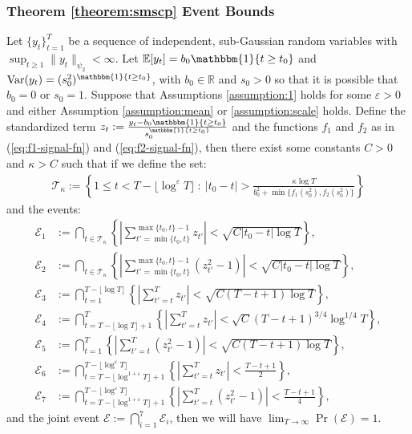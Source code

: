 
\subsubsection{Theorem \ref{theorem:smscp} Event Bounds}

\begin{lemma}\label{lemma:thm3-event-bound}
Let $\{y_t\}_{t=1}^T$ be a sequence of independent, sub-Gaussian random variables with $\sup_{t \geq 1} \lVert y_t\rVert_{\psi_2} < \infty$. Let $\E[y_t] = b_0\mathbbm{1}\{t\geq t_0\}$ and $\normalfont{\Var}(y_t) = (s_0^2)^{\mathbbm{1}\{t\geq t_0\}}$, with $b_0 \in \mathbb{R}$ and $s_0 > 0$ so that it is possible that $b_0 = 0$ or $s_0 = 1$. Suppose that Assumptions \ref{assumption:1} holds for some $\varepsilon >0$ and either Assumption \ref{assumption:mean} or \ref{assumption:scale} holds. Define the standardized term $z_t:= \frac{y_t - b_0\mathbbm{1}\{t\geq t_0\}}{s_0^{\mathbbm{1}\{t\geq t_0\}}}$ and the functions $f_1$ and $f_2$ as in (\ref{eq:f1-signal-fn}) and (\ref{eq:f2-signal-fn}), then there exist some constants $C > 0$ and $\kappa > C$ such that if we define the set:
\begin{align*}
    \mathcal{T}_{\kappa}:= \left\{1\leq t < T - \lfloor\log^{\varepsilon} T\rfloor\::\: |t_0 - t| > \frac{\kappa\log T}{b^2_0 + \min\{f_1(s_0^2),f_2(s_0^2)\}} \right\}
\end{align*}
and the events: 
\begin{align*}
    \mathcal{E}_1 &:= \bigcap_{t \in \mathcal{T}_{\kappa}} \left\{\left|\sum_{t'=\min\{t_0,t\}}^{\max\{t_0,t\}-1} z_{t'}\right| < \sqrt{C|t_0-t|\log T}\right\}, \\
    \mathcal{E}_2 &:=  \bigcap_{t \in \mathcal{T}_{\kappa}} \left\{\left|\sum_{t'=\min\{t_0,t\}}^{\max\{t_0,t\}-1} (z_{t'}^2 - 1) \right| <  \sqrt{C|t_0-t|\log T}  \right\},  \\
    \mathcal{E}_3 &:= \bigcap_{t = 1}^{ T - \lfloor\log T\rfloor}  \left\{\left|\sum_{t'=t}^T z_{t'}\right| < \sqrt{C(T-t+1)\log T}\right\}, \\
    \mathcal{E}_4 &:= \bigcap_{t = T - \lfloor \log T\rfloor +1}^T  \left\{\left|\sum_{t'=t}^T z_{t'}\right| < \sqrt{C}(T-t+1)^{3/4}\log^{1/4} T\right\}, \\
    \mathcal{E}_5 &:= \bigcap_{t=1}^T \left\{\left|\sum_{t'=t}^T (z_{t'}^2 - 1)\right| < \sqrt{C(T-t+1)\log T}\right\}, \\
    \mathcal{E}_6 &:= \bigcap_{t = T - \lfloor\log^{1+\varepsilon} T\rfloor + 1}^{T - \lfloor\log^{\varepsilon} T\rfloor} \left\{\left|\sum_{t'=t}^T z_{t'}\right| < \frac{T-t+1}{2}\right\}, \\
    \mathcal{E}_7 &:= \bigcap_{t = T - \lfloor\log^{1+\varepsilon} T\rfloor + 1}^{T - \lfloor\log^{\varepsilon} T\rfloor}  \left\{\left|\sum_{t'=t}^T (z_{t'}^2 - 1)\right| < \frac{T-t+1}{4}\right\},
\end{align*}
and the joint event $\mathcal{E} := \bigcap_{i=1}^7 \mathcal{E}_i$, then we will have $\lim_{T\to\infty} \Pr(\mathcal{E}) = 1$. 
\end{lemma}

